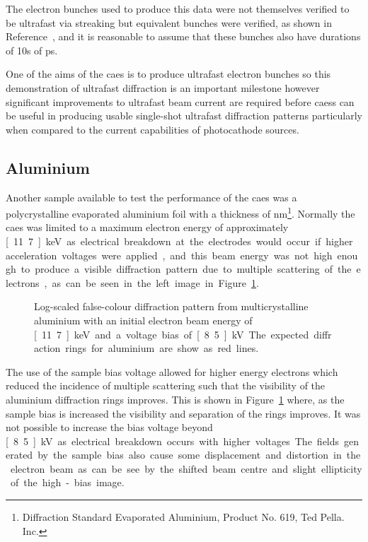 The electron bunches used to produce this data were not themselves verified to be ultrafast via streaking but equivalent bunches were verified, as shown in Reference~\cite{speirs_identification_2017}, and it is reasonable to assume that these bunches also have durations of 10s of ps.

One of the aims of the \gls{caes} is to produce ultrafast electron bunches so this demonstration of ultrafast diffraction is an important milestone however significant improvements to ultrafast beam current are required before \glspl{caes} can be useful in producing usable single-shot ultrafast diffraction patterns particularly when compared to the current capabilities of photocathode sources.

\subsection{Aluminium}\label{section:aluminium_diffraction}

Another sample available to test the performance of the \gls{caes} was a polycrystalline evaporated aluminium foil with a thickness of \unit[31]{nm}\footnote{Diffraction Standard Evaporated Aluminium, Product No. 619, Ted Pella. Inc.}.
Normally the \gls{caes} was limited to a maximum electron energy of approximately \unit[11.7]{keV} as electrical breakdown at the electrodes would occur if higher acceleration voltages were applied, and this beam energy was not high enough to produce a visible diffraction pattern due to multiple scattering of the electrons, as can be seen in the left image in Figure~\ref{figure:al_diffraction}.

\begin{figure}
    \center
    
    \caption{Log-scaled false-colour diffraction pattern from multicrystalline aluminium with an initial electron beam energy of \unit[11.7]{keV} and a voltage bias of \unit[8.5]{kV}. The expected diffraction rings for aluminium are show as red lines.}
    \label{figure:al_diffraction}
\end{figure}

The use of the sample bias voltage allowed for higher energy electrons which reduced the incidence of multiple scattering such that the visibility of the aluminium diffraction rings improves.
This is shown in Figure~\ref{figure:al_diffraction} where, as the sample bias is increased the visibility and separation of the rings improves.
It was not possible to increase the bias voltage beyond \unit[8.5]{kV} as electrical breakdown occurs with higher voltages.
The fields generated by the sample bias also cause some displacement and distortion in the electron beam as can be see by the shifted beam centre and slight ellipticity of the high-bias image.

